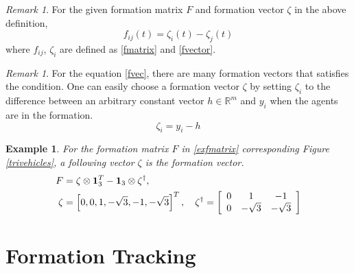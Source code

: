 \documentclass[11pt, a4paper, oneside, openany, reqno]{book}
\newtheorem{example}{Example}
\theoremstyle{definition}
\theoremstyle{remark}
\newtheorem{remark}[theorem]{Remark}
\numberwithin{equation}{chapter} %
\newcommand{\R}{\ensuremath{{\mathbb R}}}
\newcommand{\ONE}{\textbf{1}}
\begin{document}
\begin{remark}
	For the given formation matrix $ F $ and formation vector $ \zeta $ in the above definition,
	\begin{equation}
		f_{ij}(t) = \zeta_i(t) - \zeta_j(t)
	\end{equation}
	where $ f_{ij} $, $ \zeta_i $ are defined as \eqref{fmatrix} and \eqref{fvector}.
\end{remark}

\begin{remark}
	For the equation \eqref{fvec},
	there are many formation vectors that satisfies the condition.
	One can easily choose a formation vector $ \zeta $ 
	by setting $ \zeta_i $ to the difference 
	between an arbitrary constant vector $ h \in \R^m $ and $ y_i $ 
	when the agents are in the formation.\cite{faxthesis}
	\begin{equation}
		\zeta_i = y_i - h
	\end{equation}
\end{remark}

\begin{example}\label{exfvector}
	For the formation matrix $ F $ in \eqref{exfmatrix} corresponding Figure \ref{trivehicles}, 
	a following vector $ \zeta $ is the formation vector.	
	\begin{equation}\begin{split}
		F &= \zeta \otimes \ONE_{3}^T   - \ONE_{3} \otimes \zeta^{\dag}, \\
		\zeta&=\left[ 0,0,1,-\sqrt{3},-1,-\sqrt{3} \right]^T, \quad 
		\zeta^\dag = \left[  \begin{array}{c c c } 
		0 & 1 & -1 \\
		0 & -\sqrt{3} & -\sqrt{3} \\
		\end{array}\right]\\		
	\end{split}\end{equation}
\end{example}


\section{Formation Tracking}
\end{document}
